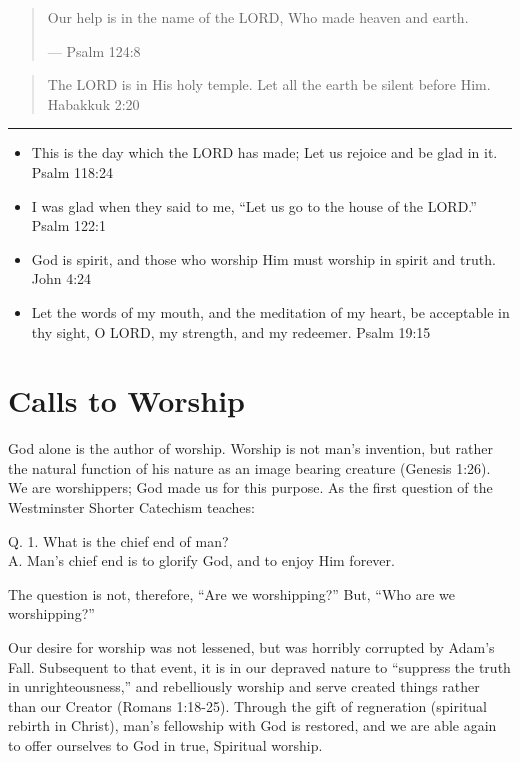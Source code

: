 \documentclass[]{book}
\begin{document}
\begin{quote}
Our help is in the name of the LORD, Who made heaven and earth.

--- Psalm 124:8
\end{quote}

\begin{quote}
The LORD is in His holy temple. Let all the earth be silent before Him.
\textbar{} Habakkuk 2:20
\end{quote}

\begin{center}\rule{0.5\linewidth}{\linethickness}\end{center}

\begin{itemize}
\item
  This is the day which the LORD has made; Let us rejoice and be glad in
  it. \textbar{} Psalm 118:24
\item
  I was glad when they said to me, ``Let us go to the house of the
  LORD.'' \textbar{} Psalm 122:1
\item
  God is spirit, and those who worship Him must worship in spirit and
  truth. \textbar{} John 4:24
\item
  Let the words of my mouth, and the meditation of my heart, be
  acceptable in thy sight, O LORD, my strength, and my redeemer.
  \textbar{} Psalm 19:15
\end{itemize}

\chapter*{Calls to Worship}\label{calls-to-worship}

God alone is the author of worship. Worship is not man's invention, but
rather the natural function of his nature as an image bearing creature
(Genesis 1:26). We are worshippers; God made us for this purpose. As the
first question of the Westminster Shorter Catechism teaches:

Q. 1. What is the chief end of man?\\
A. Man's chief end is to glorify God, and to enjoy Him forever.

The question is not, therefore, ``Are we worshipping?'' But, ``Who are
we worshipping?''

Our desire for worship was not lessened, but was horribly corrupted by
Adam's Fall. Subsequent to that event, it is in our depraved nature to
``suppress the truth in unrighteousness,'' and rebelliously worship and
serve created things rather than our Creator (Romans 1:18-25). Through
the gift of regneration (spiritual rebirth in Christ), man's fellowship
with God is restored, and we are able again to offer ourselves to God in
true, Spiritual worship.
\end{document}
